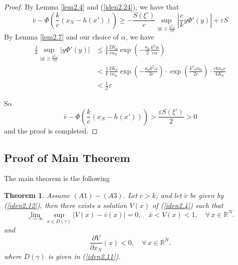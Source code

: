 \documentclass[12pt, a4paper]{article}
\newtheorem{thm}{Theorem}[section]
\numberwithin{equation}{section}
\newcommand{\R}{\mathbb{R}}
\newcommand{\pd}[2]{\frac{\partial #1}{\partial #2}}
\begin{document}
\begin{CJK}{UTF8}{bkai}
\begin{proof}
By Lemma \ref{lem2.4} and (\ref{iden2.24}), we have that
\[
	\bar{v}-\Phi\left(\frac{k}{c}(x_N-h(x'))\right)\geq-\frac{S(\xi')}{c}\sup_{|y|\geq\frac{k^2\omega}{c\alpha}}\left|\frac{c}{k}y\Phi'(y)\right|+\varepsilon S
\]
By Lemma \ref{lem2.7} and our choice of $\alpha$, we have
\begin{align*}
	\frac{1}{k}\sup_{|y|\geq\frac{k^2\omega}{c\alpha}}|y\Phi'(y)|&\leq\frac{1}{k}\frac{2K_0}{e\kappa_0}\exp(-\frac{\kappa_0}{2}\frac{k^2w}{c\alpha})\\
		&<\frac{1}{k}\frac{2K_0}{e\kappa_0}\exp(-\frac{\kappa_0k^2\omega}{2c})\cdot\exp(\frac{k^2\omega\kappa_0}{2c})\cdot\frac{ek\kappa_0\varepsilon}{4K_0}\\
		&<\frac{1}{2}\varepsilon
\end{align*}

So
\[
\bar{v}-\Phi\left(\frac{k}{c}(x_N-h(x'))\right)>\frac{\varepsilon S(\xi')}{2}>0
\]
and the proof is completed.
\end{proof}









\subsection{Proof of Main Theorem}

The main theorem is the following

\begin{thm}\cite[Theorem~1.1]{KT2011}\label{thm2.8}
	Assume $(A1)-(A3)$. Let $c>k$, and let $\bar{v}$ be given by (\ref{iden2.12}), then there exists a solution $V(x)$ of (\ref{iden2.4}) such that 
\begin{equation}
	\lim_{\gamma\to\infty}\sup_{x\in D(\gamma)}|V(x)-\bar{v}(x)|=0,\quad \bar{x}<V(x)<1,\quad\forall\,x\in\R^N.
\end{equation}
and 
\begin{equation}
	\pd{V}{x_N}(x)<0,\quad\forall\,x\in\R^N.
\end{equation}
where $D(\gamma)$ is given in (\ref{iden2.11}).
\end{thm}



\end{CJK}
\end{document}
